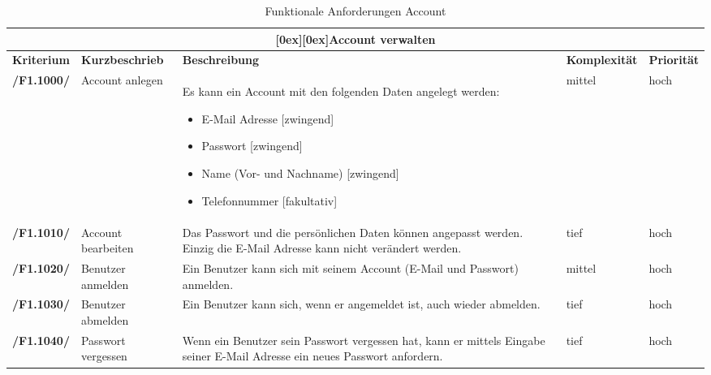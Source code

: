 \documentclass[10pt,a4paper,titlepage,twoside,german,final]{zhawreprt}
\newcommand{\AddRequirement}[2]{
\textbf{/#1#2/}
}
\newcommand{\F}[1]{
\AddRequirement{F1.}{#1}
}
\newcommand{\tableheader}[2]{\multicolumn{#1}{c}{\raisebox{-0.3em}[0ex][0ex]{\large{\textbf{#2}}}}}
\numberwithin{table}{chapter}
\begin{document}
\begin{table}[ht]\centering
\begin{longtable}{l|p{2.5cm}|p{5cm}|p{2cm}|p{1.5cm}}\hline
\tableheader{5}{Account verwalten}\\[0.3em]\hline
\textbf{Kriterium} & \textbf{Kurzbeschrieb} & \textbf{Beschreibung} & \textbf{Komplexität} & \textbf{Priorität}\\\hline
\F{1000} & Account anlegen & Es kann ein Account mit den folgenden Daten angelegt werden:\linebreak
\begin{itemize}
\item E-Mail Adresse [zwingend]
\item Passwort [zwingend]
\item Name (Vor- und Nachname) [zwingend]
\item Telefonnummer [fakultativ]
\end{itemize}
& mittel & hoch\\\hline
\F{1010} & Account bearbeiten & Das Passwort und die persönlichen Daten können angepasst werden. Einzig die E-Mail Adresse kann nicht verändert werden. & tief & hoch\\\hline
\F{1020} & Benutzer anmelden & Ein Benutzer kann sich mit seinem Account (E-Mail und Passwort) anmelden. & mittel & hoch\\\hline
\F{1030} & Benutzer abmelden & Ein Benutzer kann sich, wenn er angemeldet ist, auch wieder abmelden. & tief & hoch\\\hline
\F{1040} & Passwort vergessen & Wenn ein Benutzer sein Passwort vergessen hat, kann er mittels Eingabe seiner E-Mail Adresse ein neues Passwort anfordern. & tief & hoch\\\hline
\end{longtable}
\caption{Funktionale Anforderungen Account}\label{tbl:FuncAccount}
\end{table}
\end{document}
